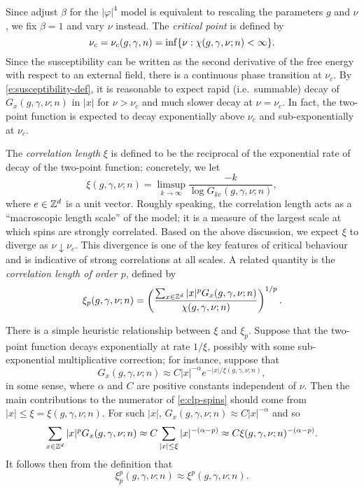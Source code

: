 Since adjust $\beta$ for the $|\varphi|^4$ model is equivalent to rescaling the
parameters $g$ and $\nu$, we fix $\beta = 1$ and vary $\nu$ instead.
The \emph{critical point} is defined by
\begin{equation}
\nu_c = \nu_c(g, \gamma, n) = \inf \{ \nu : \chi(g, \gamma, \nu; n) < \infty \}.
\end{equation}
Since the susceptibility can be written as the second derivative of the free energy
with respect to an external field, there is a continuous phase transition at $\nu_c$.
By \eqref{e:susceptibility-def}, it is
reasonable to expect rapid (i.e.\ summable) decay of $G_x(g, \gamma, \nu; n)$ in $|x|$ for
$\nu > \nu_c$ and much slower decay at $\nu = \nu_c$. In fact, the two-point function
is expected to decay exponentially above $\nu_c$ and sub-exponentially at $\nu_c$.

The \emph{correlation length} $\xi$ is defined to be the reciprocal of the exponential
rate of decay of the two-point function; concretely, we let
\begin{equation}
\xi(g, \gamma, \nu; n) = \limsup_{k\to\infty} \frac{-k}{\log G_{ke}(g, \gamma, \nu; n)},
\end{equation}
where $e \in { {{\mathbb Z}}^d }$ is a unit vector. Roughly speaking, the correlation length acts as
a ``macroscopic length scale'' of the model; it is a measure of the largest scale at
which spins are strongly correlated.
Based on the above discussion, we expect $\xi$
to diverge as $\nu\downarrow\nu_c$. This divergence is one of the
key features of critical behaviour and is indicative of strong correlations at all
scales. A related quantity is the \emph{correlation length of order $p$}, defined by
\begin{equation}
\label{e:clp-spins}
\xi_p(g, \gamma, \nu; n)
	=
\left(\frac{\sum_{x\in{ {{\mathbb Z}}^d }} |x|^p G_x(g, \gamma, \nu; n)}{\chi(g, \gamma, \nu; n)}\right)^{1/p}.
\end{equation}

\begin{rk}
There is a simple heuristic relationship between $\xi$ and $\xi_p$. Suppose that
the two-point function decays exponentially at rate $1/\xi$, possibly with some
sub-exponential multiplicative correction; for instance, suppose that
\begin{equation}
G_x(g, \gamma, \nu; n) \approx C |x|^{-\alpha} e^{-|x|/\xi(g, \gamma, \nu; n)},
\end{equation}
in some sense, where $\alpha$ and $C$ are positive constants independent of $\nu$.
Then the main contributions to the numerator of
\eqref{e:clp-spins} should come from $|x| \le \xi = \xi(g, \gamma, \nu; n)$. For such $|x|$,
$G_x(g, \gamma, \nu; n) \approx C |x|^{-\alpha}$ and so
\begin{equation}
\sum_{x\in{ {{\mathbb Z}}^d }} |x|^p G_x(g, \gamma, \nu; n)
	\approx
C \sum_{|x| \le \xi} |x|^{-(\alpha-p)}
	\approx
C \xi(g, \gamma, \nu; n)^{-(\alpha-p)}.
\end{equation}
It follows then from the definition that
\begin{equation}
\xi^p_p(g, \gamma, \nu; n) \approx \xi^p(g, \gamma, \nu; n).
\end{equation}
\end{rk}

